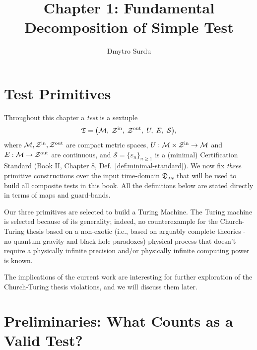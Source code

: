 \documentclass[12pt]{article}
\title{\textbf{Chapter 1: Fundamental Decomposition of Simple Test}}
\author{Dmytro Surdu}
\theoremstyle{definition}
\theoremstyle{plain}
\begin{document}
\maketitle

\section{Test Primitives}
\label{sec:test-primitives}

Throughout this chapter a \emph{test} is a sextuple
\[
  \mathfrak T = \bigl(\mathcal M,\;\mathcal Z^{\rm in},\;\mathcal Z^{\rm out},\;U,\;E,\;\mathcal S\bigr),
\]
where $\mathcal M,\mathcal Z^{\rm in},\mathcal Z^{\rm out}$ are compact metric spaces, $U:\mathcal M\times\mathcal Z^{\rm in}\to\mathcal M$ and $E:\mathcal M\to\mathcal Z^{\rm out}$ are continuous, and $\mathcal S=\{\varepsilon_n\}_{n\ge1}$ is a (minimal) Certification Standard (Book II, Chapter 8, Def.~\ref{def:minimal-standard}).  We now fix \emph{three} primitive constructions over the input time-domain \(\mathfrak{D}_{IN}\) that will be used to build all composite tests in this book.  All the definitions below are stated directly in terms of maps and guard‑bands.

Our three primitives are selected to build a Turing Machine. The Turing machine is selected because of its generality; indeed, no counterexample for the Church-Turing thesis based on a non-exotic (i.e., based on arguably complete theories - no quantum gravity and black hole paradoxes) physical process that doesn't require a physically infinite precision and/or physically infinite computing power is known. 

The implications of the current work are interesting for further exploration of the Church-Turing thesis violations, and we will discuss them later.

\section{Preliminaries: What Counts as a Valid Test?}
\label{sec:valid-test}
\end{document}
